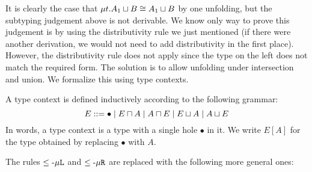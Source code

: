 It is clearly the case that $\mu{t} . {A_1 \mathbin{\sqcup} B} \cong A_1 \mathbin{\sqcup} B$ by one unfolding, but the subtyping judgement above is not derivable. We know only way to prove this judgement is by  using the distributivity rule we just mentioned (if there were another derivation, we would not need to add distributivity in the first place). However, the distributivity rule does not apply since the type on the left does not match the required form. The solution is to allow unfolding under
intersection and union. We formalize this using type contexts.

\begin{definition}
  A type context is defined inductively according to the following grammar:
  \[ E ::= \bullet \mid E \mathbin{\sqcap} A \mid A \mathbin{\sqcap} E \mid E \mathbin{\sqcup} A \mid A \mathbin{\sqcup} E \]
  In words, a type context is a type with a single hole $\bullet$ in it. We write $E[A]$ for the type obtained by replacing $\bullet$ with $A$.
\end{definition}

The rules $\le\text{-}{\mu\texttt{L}}$ and $\le\text{-}{\mu\texttt{R}}$ are replaced with the following more general ones:
